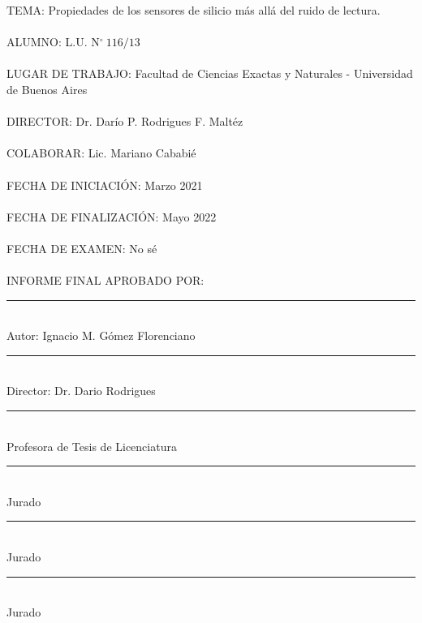 \thispagestyle{empty}
\noindent TEMA: Propiedades de los sensores de silicio más allá del ruido de lectura.\\
\\
\noindent ALUMNO: L.U. N$^\circ\ 116/13$\\
\\
\noindent LUGAR DE TRABAJO: Facultad de Ciencias Exactas y Naturales - Universidad de Buenos Aires\\
\\
\noindent DIRECTOR: Dr. Darío P. Rodrigues F. Maltéz\\
\\
\noindent COLABORAR: Lic. Mariano Cababié\\
\\
\noindent FECHA DE INICIACIÓN: Marzo 2021\\
\\
\noindent FECHA DE FINALIZACIÓN:  Mayo 2022\\
\\
\noindent FECHA DE EXAMEN: No sé\\
\\
\noindent INFORME FINAL APROBADO POR:\\
\vfill
\begin{multicols}{2}    
\rule[0pt]{2.5in}{0.5pt}\\
Autor: Ignacio M. Gómez Florenciano
\vspace{3em}

\rule[0pt]{2.5in}{0.5pt}\\
Director: Dr. Dario Rodrigues
\vspace{3em}
   
\rule[0pt]{2.5in}{0.5pt}\\
Profesora de Tesis de Licenciatura
    
\columnbreak
\rule[0pt]{2.5in}{0.5pt}\\
Jurado 
\vspace{3em}
    
\rule[0pt]{2.5in}{0.5pt}\\
Jurado 
\vspace{3em}
    
\rule[0pt]{2.5in}{0.5pt}\\
Jurado 
\end{multicols}  
\newpage
\thispagestyle{empty} \mbox{}
\thispagestyle{empty}
